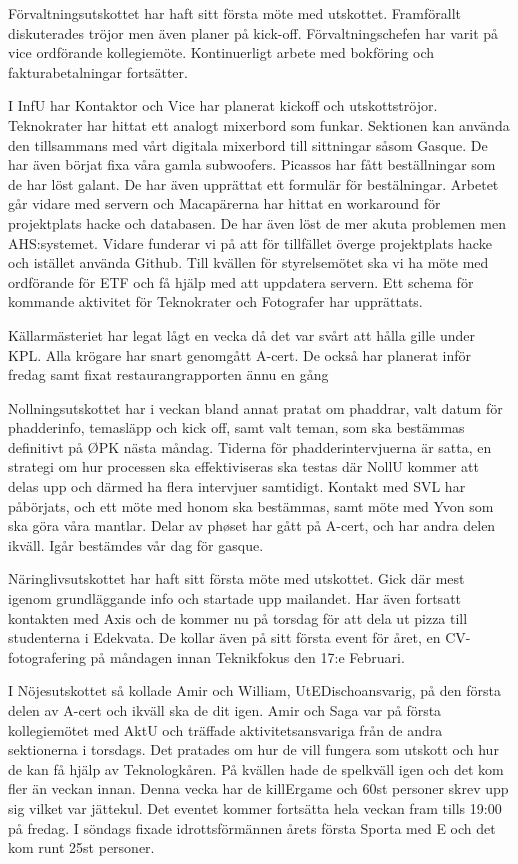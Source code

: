 \documentclass[10pt]{article}
\begin{document}
\begin{paragrafer}
\begin{paragrafer}
Förvaltningsutskottet har haft sitt första möte med utskottet. Framförallt diskuterades tröjor men även planer på kick-off. Förvaltningschefen har varit på vice ordförande kollegiemöte. Kontinuerligt arbete med bokföring och fakturabetalningar fortsätter.

I InfU har Kontaktor och Vice har planerat kickoff och utskottströjor.
Teknokrater har hittat ett analogt mixerbord som funkar. Sektionen kan använda den tillsammans med vårt digitala mixerbord till sittningar såsom Gasque. De har även börjat fixa våra gamla subwoofers.
Picassos har fått beställningar som de har löst galant. De har även upprättat ett formulär för bestälningar.
Arbetet går vidare med servern och Macapärerna har hittat en workaround för projektplats hacke och databasen. De har även löst de mer akuta problemen men AHS:systemet.
Vidare funderar vi på att för tillfället överge projektplats hacke och istället använda Github.
Till kvällen för styrelsemötet ska vi ha möte med ordförande för ETF och få hjälp med att uppdatera servern.
Ett schema för kommande aktivitet för Teknokrater och Fotografer har upprättats.

Källarmästeriet har legat lågt en vecka då det var svårt att hålla gille under KPL. Alla krögare har snart genomgått A-cert. De också har planerat inför fredag samt fixat restaurangrapporten ännu en gång

Nollningsutskottet har i veckan bland annat pratat om phaddrar, valt datum för phadderinfo, temasläpp och kick off, samt valt teman, som ska bestämmas definitivt på ØPK nästa måndag. Tiderna för phadderintervjuerna är satta, en strategi om hur processen ska effektiviseras ska testas där NollU kommer att delas upp och därmed ha flera intervjuer samtidigt. 
Kontakt med SVL har påbörjats, och ett möte med honom ska bestämmas, samt möte med Yvon som ska göra våra mantlar. 
Delar av phøset har gått på A-cert, och har andra delen ikväll. Igår bestämdes vår dag för gasque.

Näringlivsutskottet har haft sitt första möte med utskottet. Gick där mest igenom grundläggande info och startade upp mailandet. Har även fortsatt kontakten med Axis och de kommer nu på torsdag för att dela ut pizza till studenterna i Edekvata. De kollar även på sitt första event för året, en CV-fotografering på måndagen innan Teknikfokus den 17:e Februari.

I Nöjesutskottet så kollade Amir och William, UtEDischoansvarig, på den första delen av A-cert och ikväll ska de dit igen. Amir och Saga var på första kollegiemötet med AktU och träffade aktivitetsansvariga från de andra sektionerna i torsdags. Det pratades om hur de vill fungera som utskott och hur de kan få hjälp av Teknologkåren. På kvällen hade de spelkväll igen och det kom fler än veckan innan. Denna vecka har de killErgame och 60st personer skrev upp sig vilket var jättekul. Det eventet kommer fortsätta hela veckan fram tills 19:00 på fredag. I söndags fixade idrottsförmännen årets första Sporta med E och det kom runt 25st personer. 


\end{paragrafer}
\end{paragrafer}
\end{document}
